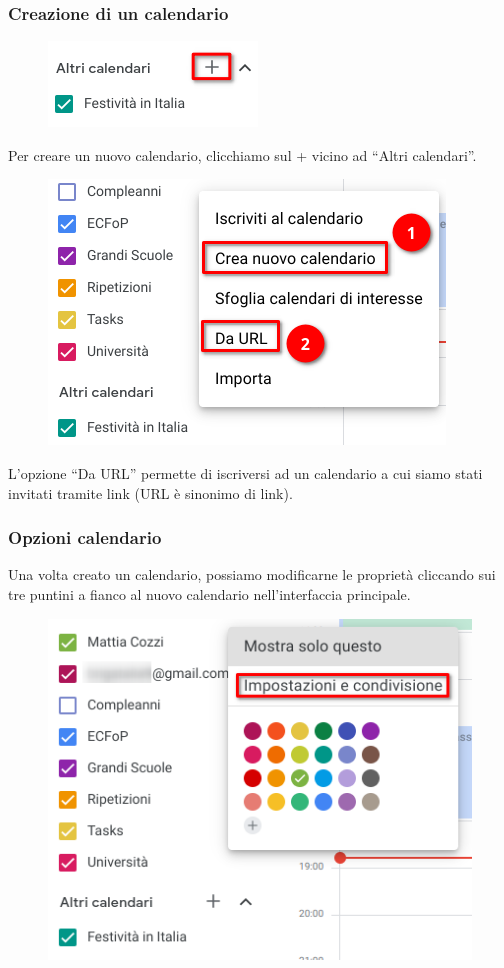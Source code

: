\documentclass[handout]{beamer}
\begin{document}
\begin{frame}
\frametitle{Creazione di un calendario}
\begin{figure}
  \includegraphics[width=.2\columnwidth]{img/calendarnuovocal.png}
\end{figure}
Per creare un nuovo calendario, clicchiamo sul + vicino ad ``Altri calendari''.

\begin{figure}
  \includegraphics[width=.4\columnwidth]{img/calendarnuovocal2.png}
\end{figure}
L'opzione ``Da URL'' permette di iscriversi ad un calendario a cui siamo stati invitati tramite link (URL è sinonimo di link).
\end{frame}


\begin{frame}
\frametitle{Opzioni calendario}
Una volta creato un calendario, possiamo modificarne le proprietà cliccando sui tre puntini a fianco al nuovo calendario nell'interfaccia principale.

\begin{figure}
  \includegraphics[width=.5\columnwidth]{img/calendarcalmod.png}
\end{figure}
\end{frame}
\end{document}
